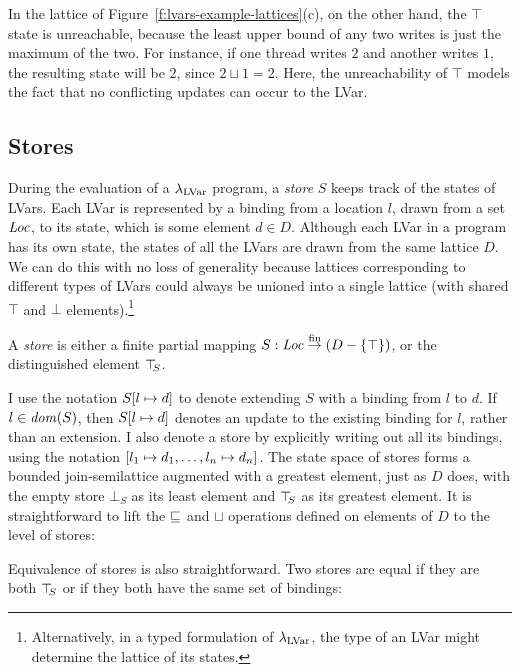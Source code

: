 In the lattice of Figure~\ref{f:lvars-example-lattices}(c), on the
other hand, the $\top$ state is unreachable, because the least upper
bound of any two writes is just the maximum of the two.  For instance,
if one thread writes $2$ and another writes $1$, the resulting state
will be $2$, since $2 \sqcup 1 = 2$.  Here, the unreachability of
$\top$ models the fact that no conflicting updates can occur to the
LVar.

\subsection{Stores}\label{subsection:lvars-stores}

During the evaluation of a $\lambda_{\textrm{LVar}}$ program, a \emph{store} $S$
keeps track of the states of LVars.  Each LVar is represented by a
binding from a location $l$, drawn from a set $\mathit{Loc}$, to its state,
which is some element $d \in D$.  Although each LVar in a program has
its own state, the states of all the LVars are drawn from the same
lattice $D$.  We can do this with no loss of generality because
lattices corresponding to different types of LVars could always be
unioned into a single lattice (with shared $\top$ and $\bot$
elements).\footnote{Alternatively, in a typed formulation of
  $\lambda_{\textrm{LVar}}$, the type of an LVar might determine the lattice of
  its states.}

\begin{definition}\label{def:lvars-store}
A \emph{store} is either a finite partial mapping $S : \mathit{Loc} \stackrel{\textrm{fin}}{\rightarrow}
(D-\lbrace \top \rbrace)$, or the distinguished element $\top\hspace{-0.85mm}_{S}$.
\end{definition}

I use the notation $S[l \mapsto d]$ to denote extending $S$ with a
binding from $l$ to $d$.  If $l \in \mathit{dom}(S)$, then $S[l \mapsto d]$
denotes an update to the existing binding for $l$, rather than an
extension.  I also denote a store by explicitly writing out all its
bindings, using the notation $\left[ l_1 \mapsto d_1,
  \dots, l_n \mapsto d_n \right]$.  The state space of stores
forms a bounded join-semilattice augmented with a greatest element,
just as $D$ does, with the empty store $\bot_S$ as its least element
and $\top\hspace{-0.85mm}_{S}$ as its greatest element.  It is straightforward to lift
the $\sqsubseteq$ and $\sqcup$ operations defined on elements of $D$ to
the level of stores:

\LVarsDefLeqStore

\LVarsDefLubStore

Equivalence of stores is also straightforward.  Two stores are equal
if they are both $\top\hspace{-0.85mm}_{S}$ or if they both have the same set of
bindings:

